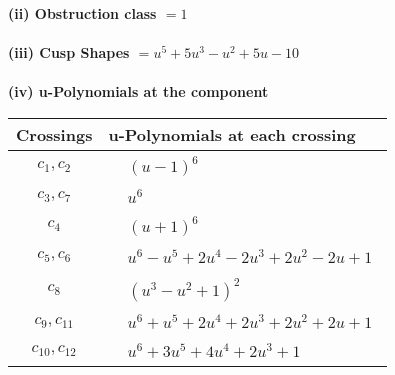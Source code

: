 \documentclass[1p]{elsarticle_modified}
\theoremstyle{definition}
\begin{document}
\flushleft \textbf{(ii) Obstruction class $= 1$}\\~\\
\flushleft \textbf{(iii) Cusp Shapes $= u^5+5 u^3- u^2+5 u-10$}\\~\\
\newpage\renewcommand{\arraystretch}{1}
\flushleft \textbf{(iv) u-Polynomials at the component}\newline \\
\begin{tabular}{m{50pt}|m{274pt}}
Crossings & \hspace{64pt}u-Polynomials at each crossing \\
\hline $$\begin{aligned}c_{1},c_{2}\end{aligned}$$&$\begin{aligned}
&(u-1)^6
\end{aligned}$\\
\hline $$\begin{aligned}c_{3},c_{7}\end{aligned}$$&$\begin{aligned}
&u^6
\end{aligned}$\\
\hline $$\begin{aligned}c_{4}\end{aligned}$$&$\begin{aligned}
&(u+1)^6
\end{aligned}$\\
\hline $$\begin{aligned}c_{5},c_{6}\end{aligned}$$&$\begin{aligned}
&u^6- u^5+2 u^4-2 u^3+2 u^2-2 u+1
\end{aligned}$\\
\hline $$\begin{aligned}c_{8}\end{aligned}$$&$\begin{aligned}
&(u^3- u^2+1)^2
\end{aligned}$\\
\hline $$\begin{aligned}c_{9},c_{11}\end{aligned}$$&$\begin{aligned}
&u^6+u^5+2 u^4+2 u^3+2 u^2+2 u+1
\end{aligned}$\\
\hline $$\begin{aligned}c_{10},c_{12}\end{aligned}$$&$\begin{aligned}
&u^6+3 u^5+4 u^4+2 u^3+1
\end{aligned}$\\
\hline
\end{tabular}\\~\\
\end{document}
